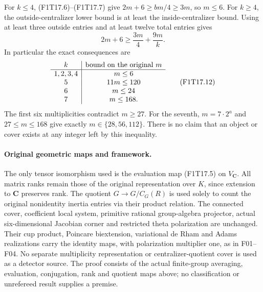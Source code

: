 For $k\le4$, (F1T17.6)--(F1T17.7) give
$2m+6\ge bm/4\ge3m$, so $m\le6$.
For $k\ge4$, the outside-centralizer lower bound is at
least the inside-centralizer bound. Using at least three
outside entries and at least twelve total entries gives
\[
                    2m+6\ge \frac{3m}{4}+\frac{9m}{k}.
 \tag{F1T17.11}
\]
In particular the exact consequences are
\[
 \begin{array}{c|c}
 k&\hbox{bound on the original }m\\ \hline
 1,2,3,4&m\le6\\
 5&11m\le120\\
 6&m\le24\\
 7&m\le168.
 \end{array}
 \tag{F1T17.12}
\]
The first six multiplicities contradict $m\ge27$. For the seventh,
$m=7\cdot2^a$ and $27\le m\le168$ give exactly
$m\in\{28,56,112\}$.
There is no claim that an object or cover exists at any
integer left by this inequality.

\paragraph{Original geometric maps and framework.}
The only tensor isomorphism used is the evaluation map
(F1T17.5) on $V_{\mathbf C}$. All matrix ranks remain
those of the original representation over $K$, since
extension to $\mathbf C$ preserves rank. The quotient
$G\to G/C_G(R)$ is used solely to count the original
nonidentity inertia entries via their product relation.
The connected cover, coefficient local system, primitive
rational group-algebra projector, actual six-dimensional
Jacobian corner and restricted theta polarization are
unchanged. Their cup product, Poincare biextension,
variational de Rham and Adams realizations carry the
identity maps, with polarization multiplier one, as in
F01--F04. No separate multiplicity representation or
centralizer-quotient cover is used as a detector source.
The proof consists of the actual finite-group averaging,
evaluation, conjugation, rank and quotient maps above;
no classification or unrefereed result supplies a premise.
